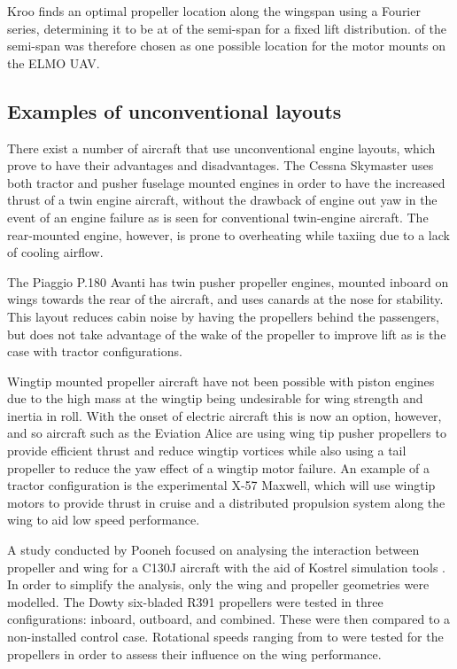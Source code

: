 \documentclass[../../main.tex]{subfiles}
\begin{document}
Kroo finds an optimal propeller location along the wingspan using a Fourier series, determining it to be at  of the semi-span for a fixed lift distribution.
 of the semi-span was therefore chosen as one possible location for the motor mounts on the ELMO UAV.

\subsection{Examples of unconventional layouts} \label{sec:introduction:background-research:examples-of-unconventional-layouts}

There exist a number of aircraft that use unconventional engine layouts, which prove to have their advantages and disadvantages.
The Cessna Skymaster uses both tractor and pusher fuselage mounted engines in order to have the increased thrust of a twin engine aircraft, without the drawback of engine out yaw in the event of an engine failure as is seen for conventional twin-engine aircraft.
The rear-mounted engine, however, is prone to overheating while taxiing due to a lack of cooling airflow.

The Piaggio P.180 Avanti has twin pusher propeller engines, mounted inboard on wings towards the rear of the aircraft, and uses canards at the nose for stability.
This layout reduces cabin noise by having the propellers behind the passengers, but does not take advantage of the wake of the propeller to improve lift as is the case with tractor configurations.

Wingtip mounted propeller aircraft have not been possible with piston engines due to the high mass at the wingtip being undesirable for wing strength and inertia in roll.
With the onset of electric aircraft this is now an option, however, and so aircraft such as the Eviation Alice are using wing tip pusher propellers to provide efficient thrust and reduce wingtip vortices while also using a tail propeller to reduce the yaw effect of a wingtip motor failure.
An example of a tractor configuration is the experimental X-57 Maxwell, which will use wingtip motors to provide thrust in cruise and a distributed propulsion system along the wing to aid low speed performance. 

A study conducted by Pooneh focused on analysing the interaction between propeller and wing for a C130J aircraft with the aid of Kostrel simulation tools \cite{pooneh-18}.
In order to simplify the analysis, only the wing and propeller geometries were modelled.
The Dowty six-bladed R391 propellers were tested in three configurations: inboard, outboard, and combined.
These were then compared to a non-installed control case.
Rotational speeds ranging from  to  were tested for the propellers in order to assess their influence on the wing performance.
\end{document}
